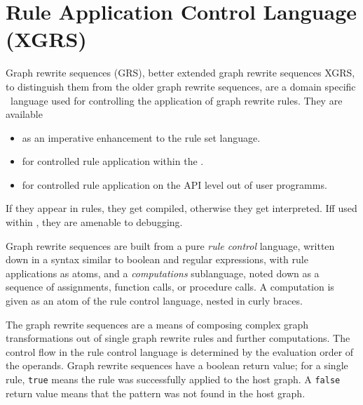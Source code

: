 \chapter{Rule Application Control Language (XGRS)}
\label{cha:xgrs}

Graph rewrite sequences (GRS), better extended graph rewrite sequences XGRS, to distinguish them from the older graph rewrite sequences, are a domain specific \GrG~language used for controlling the application of graph rewrite rules. 
They are available
\begin{itemize}
\item as an imperative enhancement to the rule set language.
\item for controlled rule application within the \GrShell.
\item for controlled rule application on the API level out of user programms.
\end{itemize}

If they appear in rules, they get compiled, otherwise they get interpreted.
Iff used within \GrShell, they are amenable to debugging.

Graph rewrite sequences are built from a pure \emph{rule control} language,
written down in a syntax similar to boolean and regular expressions, with rule applications as atoms,
and a \emph{computations} sublanguage,
noted down as a sequence of assignments, function calls, or procedure calls.
A computation is given as an atom of the rule control language, nested in curly braces.

The graph rewrite sequences are a means of composing complex graph transformations out of single graph rewrite rules and further computations.
The control flow in the rule control language is determined by the evaluation order of the operands.
Graph rewrite sequences have a boolean return value; for a single rule, \texttt{true} means the rule was successfully applied to the host graph.
A \texttt{false} return value means that the pattern was not found in the host graph. 

